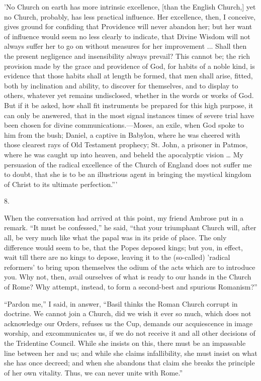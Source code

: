 'No Church on
earth has more intrinsic excellence, [than the English Church,] yet no
Church, probably, has less practical influence. Her excellence, then,
I conceive, gives ground for confiding that Providence will never
abandon her; but her want of influence would seem no less clearly to
indicate, that Divine Wisdom will not always suffer her to go on
without measures for her improvement ... Shall then the present
negligence and insensibility always prevail? This cannot be; the rich
provision made by the grace and providence of God, for habits of a
noble kind, is evidence that those
habits shall at length be formed, that men shall arise, fitted, both
by inclination and ability, to discover for themselves, and to display
to others, whatever yet remains undisclosed, whether in the words or
works of God. But if it be asked, how shall fit instruments be
prepared for this high purpose, it can only be answered, that in the
most signal instances times of severe trial have been chosen for
divine communications.—Moses, an exile, when God spoke to him from
the bush; Daniel, a captive in Babylon, where he was cheered with
those clearest rays of Old Testament prophecy; St. John, a prisoner in
Patmos, where he was caught up into heaven, and beheld the apocalyptic
vision … My persuasion of the radical excellence of the Church of
England does not suffer me to doubt, that she is to be an illustrious
agent in bringing the mystical kingdom of Christ to its ultimate
perfection.'''

8.

When the conversation had arrived at this point,
my friend Ambrose put in a remark. ``It must be confessed,'' he said, ``that
your triumphant Church will, after all, be very much like what the
papal was in its pride of place. The only difference would seem to be,
that the Popes deposed kings; but you, in effect, wait till there are
no kings to depose, leaving it to the (so-called) 'radical reformers'
to bring upon themselves the odium of the acts which are to introduce
you. Why not, then, avail ourselves of what is ready to our hands in
the Church of Rome? Why attempt, instead, to form a second-best and
spurious Romanism?''

``Pardon me,'' I said, in answer, ``Basil thinks the
Roman Church corrupt in doctrine. We cannot join a Church, did we wish
it ever so much, which does not acknowledge our Orders, refuses us the
Cup, demands our acquiescence in image worship, and excommunicates us,
if we do not receive it and all other decisions of the Tridentine
Council. While she insists on this, there must be an impassable line
between her and us; and while she claims infallibility, she must
insist on what she has once decreed; and when she abandons that claim
she breaks the principle of her own vitality. Thus, we can never unite
with Rome.''

